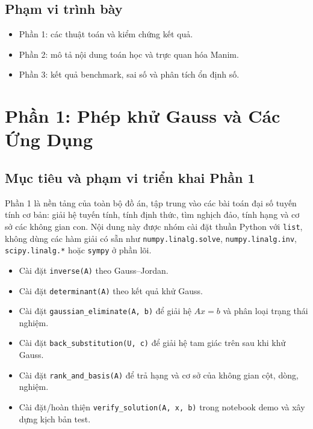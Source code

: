 \documentclass[a4paper]{article}
\begin{document}
\subsection{Phạm vi trình bày}
\begin{itemize}
    \item Phần 1: các thuật toán và kiểm chứng kết quả.
    \item Phần 2: mô tả nội dung toán học và trực quan hóa Manim.
    \item Phần 3: kết quả benchmark, sai số và phân tích ổn định số.
\end{itemize}


\section{Phần 1: Phép khử Gauss và Các Ứng Dụng}

\subsection{Mục tiêu và phạm vi triển khai Phần 1}

Phần 1 là nền tảng của toàn bộ đồ án, tập trung vào các bài toán đại số tuyến tính cơ bản: giải hệ tuyến tính, tính định thức, tìm nghịch đảo, tính hạng và cơ sở các không gian con. Nội dung này được nhóm cài đặt thuần Python với \texttt{list}, không dùng các hàm giải có sẵn như \texttt{numpy.linalg.solve}, \texttt{numpy.linalg.inv}, \texttt{scipy.linalg.*} hoặc \texttt{sympy} ở phần lõi.
\begin{itemize}
    \item Cài đặt \texttt{inverse(A)} theo Gauss--Jordan.
    \item Cài đặt \texttt{determinant(A)} theo kết quả khử Gauss.
    \item Cài đặt \texttt{gaussian\_eliminate(A, b)} để giải hệ \(Ax=b\) và phân loại trạng thái nghiệm.
    \item Cài đặt \texttt{back\_substitution(U, c)} để giải hệ tam giác trên sau khi khử Gauss.
    \item Cài đặt \texttt{rank\_and\_basis(A)} để trả hạng và cơ sở của không gian cột, dòng, nghiệm.
    \item Cài đặt/hoàn thiện \texttt{verify\_solution(A, x, b)} trong notebook demo và xây dựng kịch bản test.
\end{itemize}
\end{document}
